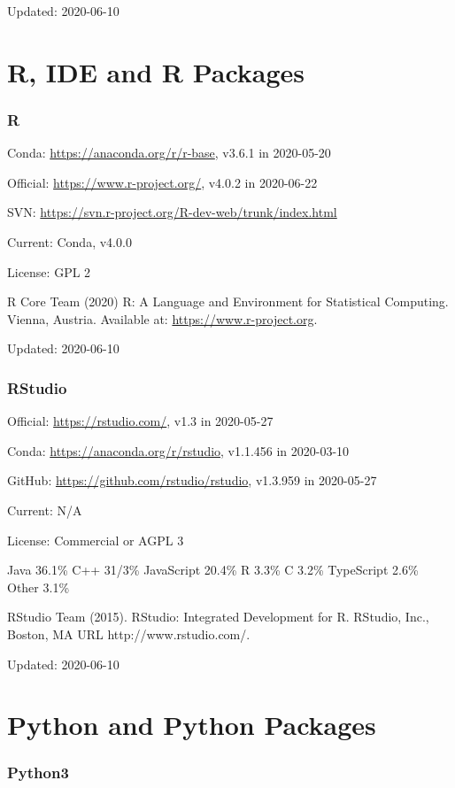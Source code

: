 \documentclass[]{article}
\begin{document}
Updated: 2020-06-10

\part{R, IDE and R Packages}

\section{R}

Conda: \url{https://anaconda.org/r/r-base}, v3.6.1 in 2020-05-20

Official: \url{https://www.r-project.org/}, v4.0.2 in 2020-06-22

SVN: \url{https://svn.r-project.org/R-dev-web/trunk/index.html}

Current: Conda, v4.0.0

License: GPL 2

R Core Team (2020) R: A Language and Environment for Statistical Computing. Vienna, Austria. Available at: \url{https://www.r-project.org}.

Updated: 2020-06-10

\section{RStudio}

Official: \url{https://rstudio.com/}, v1.3 in 2020-05-27

Conda: \url{https://anaconda.org/r/rstudio}, v1.1.456 in 2020-03-10

GitHub: \url{https://github.com/rstudio/rstudio}, v1.3.959 in 2020-05-27

Current: N/A

License: Commercial or AGPL 3

Java 36.1\% C++ 31/3\% JavaScript 20.4\% R 3.3\% C 3.2\% TypeScript 2.6\% Other 3.1\% 

RStudio Team (2015). RStudio: Integrated Development for R. RStudio, Inc., Boston, MA URL http://www.rstudio.com/.

Updated: 2020-06-10

\part{Python and Python Packages}

\section{Python3}
\end{document}
